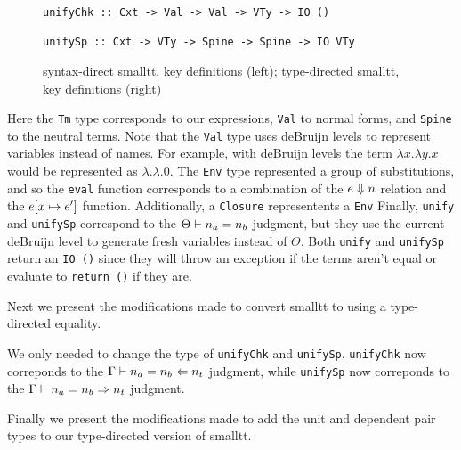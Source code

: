 \begin{figure*}
\begin{minipage}[t]{.54\textwidth}
\begin{leftbar}
\begin{lstlisting}
unifyChk :: Cxt -> Val -> Val -> VTy -> IO ()

unifySp :: Cxt -> VTy -> Spine -> Spine -> IO VTy
\end{lstlisting}
\end{leftbar}
\end{minipage}
\caption{syntax-direct smalltt, key definitions (left); type-directed smalltt, key definitions (right)}
\label{fig:smalltt}
\end{figure*}

Here the \lstinline{Tm} type corresponds to our expressions, \lstinline{Val} to normal forms, and \lstinline{Spine} to the neutral terms.
Note that the \lstinline{Val} type uses deBruijn levels to represent variables instead of names.
For example, with deBruijn levels the term $\lambda x. \lambda y. x$ would be represented as $\lambda. \lambda. 0$.
The \lstinline{Env} type represented a group of substitutions, and so the \lstinline{eval} function corresponds to a combination of the $e \Downarrow n$ relation and the $e [x \mapsto e']$ function.
Additionally, a \lstinline{Closure} representents a \lstinline{Env}
Finally, \lstinline{unify} and \lstinline{unifySp} correspond to the $\Theta \vdash n_a = n_b$ judgment, but they use the current deBruijn level to generate fresh variables instead of $\Theta$.
Both \lstinline{unify} and \lstinline{unifySp} return an \lstinline{IO ()} since they will throw an exception if the terms aren't equal or evaluate to \lstinline{return ()} if they are.

Next we present the modifications made to convert smalltt to using a type-directed equality.

We only needed to change the type of \lstinline{unifyChk} and \lstinline{unifySp}.
\lstinline{unifyChk} now correponds to the $\Gamma \vdash n_a = n_b \Leftarrow n_t$ judgment, while \lstinline{unifySp} now correponds to the $\Gamma \vdash n_a = n_b \Rightarrow n_t$ judgment.

Finally we present the modifications made to add the unit and dependent pair types to our type-directed version of smalltt.


